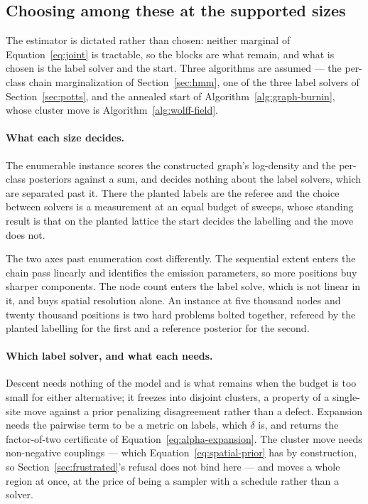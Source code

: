 \documentclass[11pt,a4paper]{article}
\begin{document}
\subsection{Choosing among these at the supported sizes}
\label{sec:coupled:discussion}
The estimator is dictated rather than chosen: neither marginal of
Equation~\ref{eq:joint} is tractable, so the blocks are what remain, and what
is chosen is the label solver and the start. Three algorithms are assumed ---
the per-class chain marginalization of Section~\ref{sec:hmm}, one of the three
label solvers of Section~\ref{sec:potts}, and the annealed start of
Algorithm~\ref{alg:graph-burnin}, whose cluster move is
Algorithm~\ref{alg:wolff-field}.

\paragraph{What each size decides.}
The enumerable instance scores the constructed graph's log-density and the
per-class posteriors against a sum, and decides nothing about the label
solvers, which are separated past it. There the planted labels are the referee
and the choice between solvers is a measurement at an equal budget of sweeps,
whose standing result is that on the planted lattice the start decides the
labelling and the move does not.

The two axes past enumeration cost differently. The sequential extent enters
the chain pass linearly and identifies the emission parameters, so more
positions buy sharper components. The node count enters the label solve, which
is not linear in it, and buys spatial resolution alone. An instance at five
thousand nodes and twenty thousand positions is two hard problems bolted
together, refereed by the planted labelling for the first and a reference
posterior for the second.

\paragraph{Which label solver, and what each needs.}
Descent needs nothing of the model and is what remains when the budget is too
small for either alternative; it freezes into disjoint clusters, a property of
a single-site move against a prior penalizing disagreement rather than a
defect. Expansion needs the pairwise term to be a metric on labels, which
$\delta$ is, and returns the factor-of-two certificate of
Equation~\ref{eq:alpha-expansion}. The cluster move needs non-negative
couplings --- which Equation~\ref{eq:spatial-prior} has by construction, so
Section~\ref{sec:frustrated}'s refusal does not bind here --- and moves a whole
region at once, at the price of being a sampler with a schedule rather than a
solver.
\end{document}
